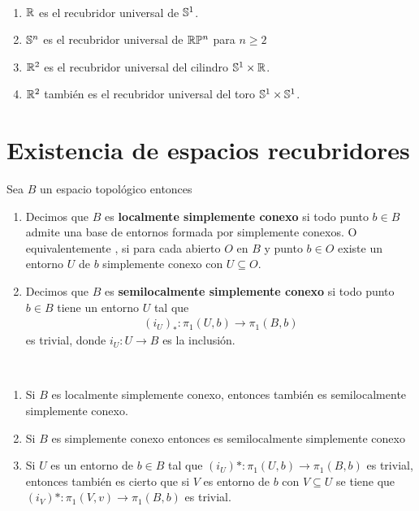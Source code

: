 \begin{ejemplo}\
    \begin{enumerate}
        \item $\mathbb{R}$ es el recubridor universal de $\mathbb{S}^1$.
        \item $\mathbb{S}^n$ es el recubridor universal de $\mathbb{R}\mathbb{P}^n$ para $n\geq 2$
        \item $\mathbb{R}^2$ es el recubridor universal del cilindro $\mathbb{S}^1 \times \mathbb{R}$.
        \item $\mathbb{R}^2$ también es el recubridor universal del toro $\mathbb{S}^1\times \mathbb{S}^1$.
    \end{enumerate}
\end{ejemplo}

\section{Existencia de espacios recubridores}

\begin{definicion}
    Sea $B$ un espacio topológico entonces 
    \begin{enumerate}
        \item Decimos que $B$ es \textbf{localmente simplemente conexo} si todo punto $b\in B$ admite una base de entornos formada por simplemente conexos. O equivalentemente , si para cada abierto $O$ en $B$ y punto $b\in O$ existe un entorno $U$ de $b$ simplemente conexo con $U\subseteq O$.

        \item Decimos que $B$ es \textbf{semilocalmente simplemente conexo} si todo punto $b\in B$ tiene un entorno $U$ tal que 
        \begin{gather*}
            (i_U)_* : \pi_1(U,b) \to \pi_1(B,b)
        \end{gather*}
        es trivial, donde $i_U:U\to B$ es la inclusión.
    \end{enumerate}
\end{definicion}

\begin{observacion}\
    \begin{enumerate}
        \item Si $B$ es localmente simplemente conexo, entonces también es semilocalmente simplemente conexo.
        \item Si $B$ es simplemente conexo entonces es semilocalmente simplemente conexo
        \item Si $U$ es un entorno de $b\in B$ tal que $(i_U)*: \pi_1(U,b) \to \pi_1(B,b)$ es trivial, entonces también es cierto que si $V$ es entorno de $b$ con $V\subseteq U$ se tiene que $(i_V)* : \pi_1(V,v)\to \pi_1(B,b)$ es trivial.
    \end{enumerate}
\end{observacion}

